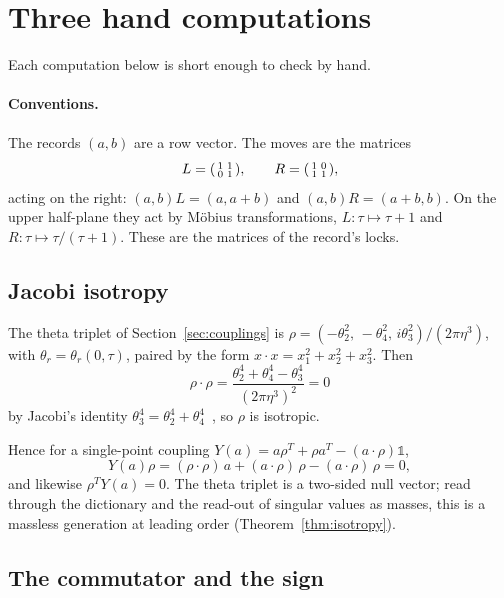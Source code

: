 \section{Three hand computations}\label{app:hand}

Each computation below is short enough to check by hand.

\paragraph{Conventions.} The records $(a,b)$ are a row vector. The moves are the matrices
\[
L=\begin{psmallmatrix}1&1\\0&1\end{psmallmatrix},\qquad R=\begin{psmallmatrix}1&0\\1&1\end{psmallmatrix},
\]
acting on the right: $(a,b)L=(a,a+b)$ and $(a,b)R=(a+b,b)$. On the upper half-plane they act by Möbius
transformations, $L:\tau\mapsto\tau+1$ and $R:\tau\mapsto\tau/(\tau+1)$. These are the matrices of the record's locks.

\subsection{Jacobi isotropy}

The theta triplet of Section~\ref{sec:couplings} is
$\rho=(-\theta_2^2,\,-\theta_4^2,\,i\theta_3^2)/(2\pi\eta^3)$, with $\theta_r=\theta_r(0,\tau)$, paired by the form
$x\cdot x=x_1^2+x_2^2+x_3^2$. Then
\[
  \rho\cdot\rho=\frac{\theta_2^4+\theta_4^4-\theta_3^4}{(2\pi\eta^3)^2}=0
\]
by Jacobi's identity $\theta_3^4=\theta_2^4+\theta_4^4$~\cite{WhittakerWatson1927}, so $\rho$ is isotropic.

Hence for a single-point coupling $Y(a)=a\rho^T+\rho a^T-(a\cdot\rho)\mathbb 1$,
\[
  Y(a)\rho=(\rho\cdot\rho)\,a+(a\cdot\rho)\,\rho-(a\cdot\rho)\,\rho=0,
\]
and likewise $\rho^TY(a)=0$. The theta triplet is a two-sided null vector; read through the dictionary and the read-out of singular values as masses, this is a massless generation at leading
order (Theorem~\ref{thm:isotropy}).

\subsection{The commutator and the sign}

